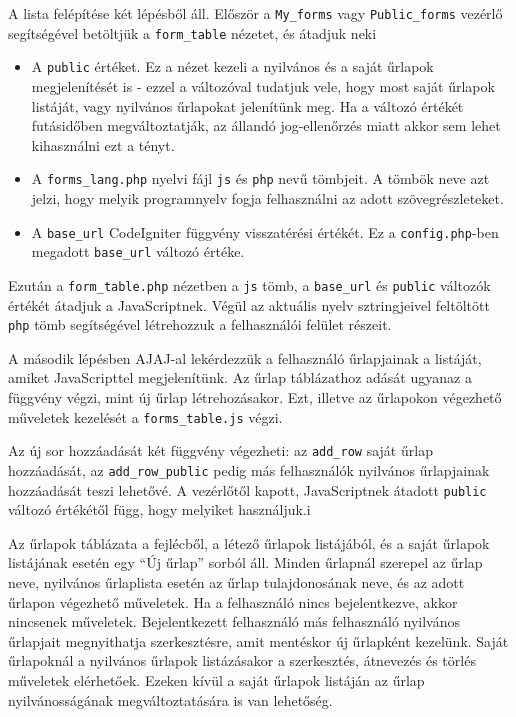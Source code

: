 \documentclass[12pt,a4paper,twoside]{article}
\begin{document}
A lista felépítése két lépésből áll. Először a \texttt{My\_forms} vagy
\texttt{Public\_forms} vezérlő
segítségével betöltjük a \texttt{form\_table} nézetet, és átadjuk neki
\begin{itemize}
\item A \texttt{public} értéket. Ez a nézet kezeli a nyilvános és a saját
  űrlapok megjelenítését is - ezzel a változóval tudatjuk vele, hogy most saját
  űrlapok listáját, vagy nyilvános űrlapokat jelenítünk meg. Ha a változó
  értékét futásidőben megváltoztatják, az állandó jog-ellenőrzés miatt akkor sem
  lehet kihasználni ezt a tényt.
\item A \texttt{forms\_lang.php} nyelvi fájl \texttt{js} és \texttt{php} nevű
  tömbjeit. A tömbök neve azt jelzi, hogy melyik programnyelv fogja felhasználni
  az adott szövegrészleteket.
\item A \texttt{base\_url} CodeIgniter függvény visszatérési értékét. Ez a
  \texttt{config.php}-ben megadott \texttt{base\_url} változó értéke.
\end{itemize}

Ezután a \texttt{form\_table.php} nézetben a \texttt{js} tömb, a
\texttt{base\_url} és \texttt{public} változók értékét átadjuk a
JavaScriptnek. Végül az aktuális nyelv sztringjeivel feltöltött \texttt{php}
tömb segítségével létrehozzuk a felhasználói felület részeit.

\vspace{1cm}

A második lépésben AJAJ-al lekérdezzük a felhasználó űrlapjainak
a listáját, amiket JavaScripttel megjelenítünk. Az űrlap táblázathoz adását
ugyanaz a függvény végzi, mint új űrlap létrehozásakor. Ezt,
illetve az űrlapokon végezhető műveletek kezelését a
\texttt{forms\_table.js} végzi.

Az új sor hozzáadását két függvény végezheti: az \texttt{add\_row} saját űrlap
hozzáadását, az \texttt{add\_row\_public} pedig más felhasználók nyilvános
űrlapjainak hozzáadását teszi lehetővé. A vezérlőtől kapott, JavaScriptnek
átadott \texttt{public} változó értékétől függ, hogy melyiket használjuk.i

Az űrlapok táblázata a fejlécből, a létező űrlapok listájából, és a saját
űrlapok listájának esetén egy ``Új űrlap'' sorból áll. Minden űrlapnál szerepel
az űrlap neve, nyilvános űrlaplista esetén az űrlap tulajdonosának neve, és az
adott űrlapon végezhető műveletek. Ha a felhasználó nincs bejelentkezve, akkor
nincsenek műveletek. Bejelentkezett felhasználó más felhasználó nyilvános űrlapjait
megnyithatja szerkesztésre, amit mentéskor új űrlapként kezelünk.
Saját űrlapoknál a nyilvános űrlapok listázásakor a szerkesztés,
átnevezés és törlés műveletek elérhetőek. Ezeken kívül a saját űrlapok listáján
az űrlap nyilvánosságának megváltoztatására is van lehetőség.
\end{document}
